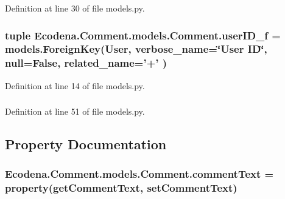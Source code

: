 Definition at line 30 of file models.py.

\hypertarget{class_ecodena_1_1_comment_1_1models_1_1_comment_aabc6fe0feb8814bacc07dced3de8e401}{
\subsubsection[{userID\_\-f}]{\setlength{\rightskip}{0pt plus 5cm}tuple {\bf Ecodena.Comment.models.Comment.userID\_\-f} = models.ForeignKey(User, verbose\_\-name=\char`\"{}User ID\char`\"{}, null=False, related\_\-name='+' )}}
\label{d9/d86/class_ecodena_1_1_comment_1_1models_1_1_comment_aabc6fe0feb8814bacc07dced3de8e401}


Definition at line 14 of file models.py.

\hypertarget{class_ecodena_1_1_comment_1_1models_1_1_comment_abe252b90b2a4fcb55b86fcdc12e9ddd5}{
\subsubsection[{userID\_\-f}]{}}
\label{d9/d86/class_ecodena_1_1_comment_1_1models_1_1_comment_abe252b90b2a4fcb55b86fcdc12e9ddd5}


Definition at line 51 of file models.py.



\subsection{Property Documentation}
\hypertarget{class_ecodena_1_1_comment_1_1models_1_1_comment_a38677f64debb3869a68942d57274643a}{
\subsubsection[{commentText}]{\setlength{\rightskip}{0pt plus 5cm}Ecodena.Comment.models.Comment.commentText = property(getCommentText, setCommentText)}}
\label{d9/d86/class_ecodena_1_1_comment_1_1models_1_1_comment_a38677f64debb3869a68942d57274643a}


